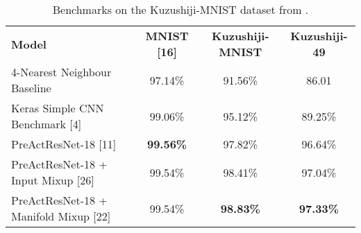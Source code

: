 \begin{table*}[h]
	\begin{tabular}{lccc}
		\rowcolor[HTML]{EFEFEF}
		\textbf{Model}                            & \textbf{MNIST {[}16{]}} & \textbf{Kuzushiji-MNIST} & \textbf{Kuzushiji-49} \\
		4-Nearest Neighbour Baseline              & 97.14\%                 & 91.56\%                  & 86.01                 \\
		Keras Simple CNN Benchmark {[}4{]}        & 99.06\%                 & 95.12\%                  & 89.25\%               \\
		PreActResNet-18 {[}11{]}                  & \textbf{99.56\%}        & 97.82\%                  & 96.64\%               \\
		PreActResNet-18 + Input Mixup {[}26{]}    & 99.54\%                 & 98.41\%                  & 97.04\%               \\
		PreActResNet-18 + Manifold Mixup {[}22{]} & 99.54\%                 & \textbf{98.83\%}         & \textbf{97.33\%}
	\end{tabular}
	\caption{Benchmarks on the Kuzushiji-MNIST dataset from \cite{Clanuwat2018-vm}.}
	\label{tab:kuzushiji-benchmarks}
\end{table*}